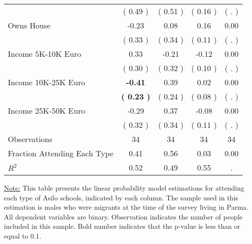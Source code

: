 \begin{table}[H]
{\begin{tabular}{lcccc}
\quad  & (     0.49 ) & (     0.51 )  & (     0.16 )  & (        . )  \\
\quad Owns House &     -0.23 &      0.08 &      0.16 &      0.00 \\
\quad  & (     0.33 ) & (     0.34 )  & (     0.11 )  & (        . )  \\
\quad Income 5K-10K Euro &      0.33 &     -0.21 &     -0.12 &      0.00 \\
\quad  & (     0.30 ) & (     0.32 )  & (     0.10 )  & (        . )  \\
\quad Income 10K-25K Euro & \textbf{    -0.41} &      0.39 &      0.02 &      0.00 \\
\quad  & \textbf{(     0.23 )} & (     0.24 )  & (     0.08 )  & (        . )  \\
\quad Income 25K-50K Euro &     -0.29 &      0.37 &     -0.08 &      0.00 \\
\quad  & (     0.32 ) & (     0.34 )  & (     0.11 )  & (        . )  \\
\midrule
Observations & 34 & 34 & 34 & 34 \\
Fraction Attending Each Type &      0.41 &      0.56 &      0.03 &      0.00 \\
\midrule
$ R^2$ &      0.52 &      0.49 &      0.55 &         . \\
\bottomrule
\end{tabular}}
\end{table}
\begin{footnotesize}
\noindent\underline{Note:} This table presents the linear probability model estimations for attending each type of Asilo schools, indicated by each column. The sample used in this estimation is males who were migrants at the time of the survey living in Parma. All dependent variables are binary. Observation indicates the number of people included in this sample. Bold number indicates that the p-value is less than or equal to 0.1.
\end{footnotesize}
